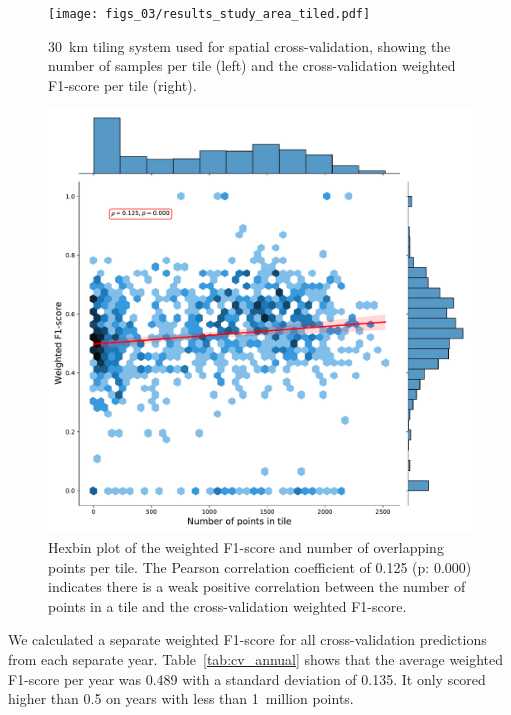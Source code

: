         \begin{figure}[!hp]
        \centering
        \texttt{[image: figs\_03/results\_study\_area\_tiled.pdf]}
        \caption{30~km tiling system used for spatial cross-validation, showing the number of samples per tile (left) and the cross-validation weighted F1-score per tile (right).}
        \label{fig:cv_spatial}
        \includegraphics[width=.75\linewidth]{figs_03/results_tiles_support_vs_f1.pdf}
        \caption{Hexbin plot of the weighted F1-score and number of overlapping points per tile. The Pearson correlation coefficient of 0.125 (p: 0.000) indicates there is a weak positive correlation between the number of points in a tile and the cross-validation weighted F1-score.}
        \label{fig:tiles_support_vs_v1}
        \end{figure}
        
        We calculated a separate weighted F1-score for all cross-validation predictions from each separate year. Table\@~\ref{tab:cv_annual} shows that the average weighted F1-score per year was 0.489 with a standard deviation of 0.135. It only scored higher than 0.5 on years with less than 1~million points.
        
